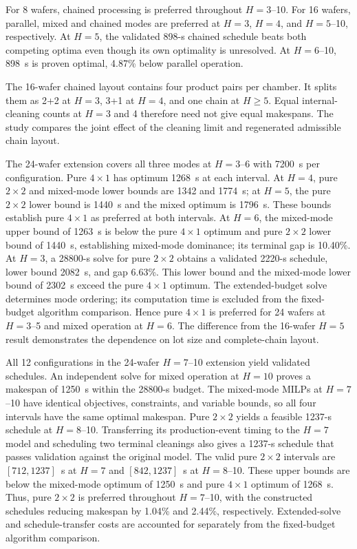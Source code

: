 \documentclass[journal]{IEEEtran}
\newcounter{algorithm}
\begin{document}
For 8 wafers, chained processing is preferred throughout $H=3$--10. For 16 wafers, parallel, mixed and chained modes are preferred at $H=3$, $H=4$, and $H=5$--10, respectively. At $H=5$, the validated 898-s chained schedule beats both competing optima even though its own optimality is unresolved. At $H=6$--10, 898~s is proven optimal, 4.87\% below parallel operation.

The 16-wafer chained layout contains four product pairs per chamber. It splits them as 2+2 at $H=3$, 3+1 at $H=4$, and one chain at $H\ge5$. Equal internal-cleaning counts at $H=3$ and 4 therefore need not give equal makespans. The study compares the joint effect of the cleaning limit and regenerated admissible chain layout.

The 24-wafer extension covers all three modes at $H=3$--6 with 7200~s per configuration. Pure $4\times1$ has optimum 1268~s at each interval. At $H=4$, pure $2\times2$ and mixed-mode lower bounds are 1342 and 1774~s; at $H=5$, the pure $2\times2$ lower bound is 1440~s and the mixed optimum is 1796~s. These bounds establish pure $4\times1$ as preferred at both intervals. At $H=6$, the mixed-mode upper bound of 1263~s is below the pure $4\times1$ optimum and pure $2\times2$ lower bound of 1440~s, establishing mixed-mode dominance; its terminal gap is 10.40\%. At $H=3$, a 28800-s solve for pure $2\times2$ obtains a validated 2220-s schedule, lower bound 2082~s, and gap 6.63\%. This lower bound and the mixed-mode lower bound of 2302~s exceed the pure $4\times1$ optimum. The extended-budget solve determines mode ordering; its computation time is excluded from the fixed-budget algorithm comparison. Hence pure $4\times1$ is preferred for 24 wafers at $H=3$--5 and mixed operation at $H=6$. The difference from the 16-wafer $H=5$ result demonstrates the dependence on lot size and complete-chain layout.

All 12 configurations in the 24-wafer $H=7$--10 extension yield validated schedules. An independent solve for mixed operation at $H=10$ proves a makespan of 1250~s within the 28800-s budget. The mixed-mode MILPs at $H=7$--10 have identical objectives, constraints, and variable bounds, so all four intervals have the same optimal makespan. Pure $2\times2$ yields a feasible 1237-s schedule at $H=8$--10. Transferring its production-event timing to the $H=7$ model and scheduling two terminal cleanings also gives a 1237-s schedule that passes validation against the original model. The valid pure $2\times2$ intervals are $[712,1237]$~s at $H=7$ and $[842,1237]$~s at $H=8$--10. These upper bounds are below the mixed-mode optimum of 1250~s and pure $4\times1$ optimum of 1268~s. Thus, pure $2\times2$ is preferred throughout $H=7$--10, with the constructed schedules reducing makespan by 1.04\% and 2.44\%, respectively. Extended-solve and schedule-transfer costs are accounted for separately from the fixed-budget algorithm comparison.
\end{document}
